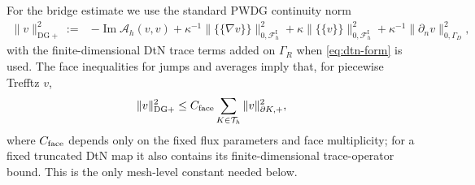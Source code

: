 \documentclass[11pt]{article}
\newcommand{\Th}{\mathcal{T}_h}
\newcommand{\FhI}{\mathcal{F}_h^{\mathrm I}}
\newcommand{\avg}[1]{\{\!\!\{#1\}\!\!\}}
\renewcommand{\Im}{\operatorname{Im}}
\numberwithin{equation}{section}
\begin{document}
For the bridge estimate we use the standard PWDG continuity norm
\begin{align}\label{eq:DGplus-def}
 \|v\|_{\mathrm{DG}+}^2
 :={}&-\Im\mathscr A_h(v,v)
 +\kappa^{-1}\|\avg{\nabla v}\|_{0,\FhI}^2
 +\kappa\|\avg v\|_{0,\FhI}^2
 +\kappa^{-1}\|\partial_n v\|_{0,\Gamma_D}^2,
\end{align}
with the finite-dimensional DtN trace terms added on $\Gamma_R$ when \eqref{eq:dtn-form} is used.  The face inequalities for jumps and averages imply that, for piecewise Trefftz $v$,
\begin{equation}\label{eq:DGplus-boundary-control}
 \|v\|_{\mathrm{DG}+}^2
 \le C_{\rm face}\sum_{K\in\Th}\|v\|_{\partial K,+}^2,
\end{equation}
where $C_{\rm face}$ depends only on the fixed flux parameters and face multiplicity; for a fixed truncated DtN map it also contains its finite-dimensional trace-operator bound.  This is the only mesh-level constant needed below.
\end{document}
